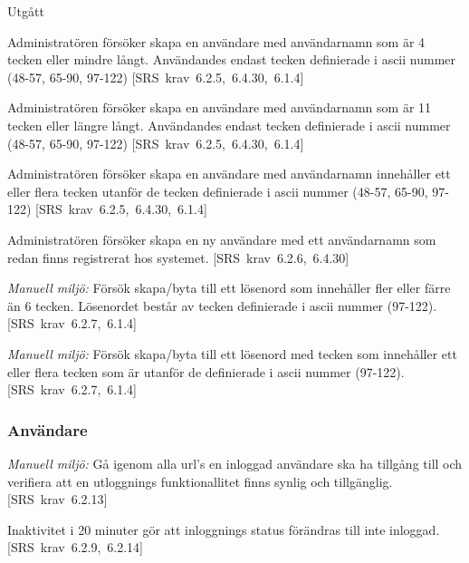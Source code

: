 \documentclass[a4paper]{article}
\def\reqinside{\hfil\penalty 100 \hfilneg \hbox}
\def \req [#1]{\reqinside{[SRS krav #1]}}
\begin{document}
\begin{appendices}
\begin{FT}
\item
Utgått

\item
Administratören försöker skapa en användare med användarnamn som är 4 tecken eller mindre långt. Användandes endast tecken definierade i ascii nummer (48-57, 65-90, 97-122)
\req[6.2.5, 6.4.30, 6.1.4]

\item
Administratören försöker skapa en användare med användarnamn som är 11 tecken eller längre långt.
Användandes endast tecken definierade i ascii nummer (48-57, 65-90, 97-122)
\req[6.2.5, 6.4.30, 6.1.4]

\item
Administratören försöker skapa en användare med användarnamn innehåller ett eller flera tecken utanför de tecken definierade i ascii nummer (48-57, 65-90, 97-122)
\req[6.2.5, 6.4.30, 6.1.4]

\item
Administratören försöker skapa en ny användare med ett användarnamn som redan finns registrerat hos systemet.
\req[6.2.6, 6.4.30]

\item
\emph{Manuell miljö:} Försök skapa/byta till ett lösenord som innehåller fler eller färre än 6 tecken. Lösenordet består av tecken definierade i ascii nummer (97-122).
\req[6.2.7, 6.1.4]

\item
\emph{Manuell miljö:} Försök skapa/byta till ett lösenord med tecken som innehåller ett eller flera tecken som är utanför de definierade i ascii nummer (97-122).
\req[6.2.7, 6.1.4]
\end{FT}

\subsubsection{Användare}

\begin{FT}
\item
\emph{Manuell miljö:} Gå igenom alla url's en inloggad användare ska ha tillgång till och verifiera att en utloggnings funktionallitet finns synlig och tillgänglig.
\req[6.2.13]

\item
Inaktivitet i 20 minuter gör att inloggnings status förändras till inte inloggad.
\req[6.2.9, 6.2.14]
\end{FT}


\end{appendices}
\end{document}
